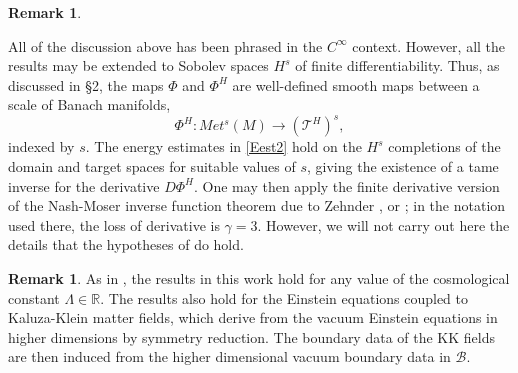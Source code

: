 \documentclass[10pt]{amsart}
\newcommand{\g}{\gamma}
\newcommand{\cT}{{\mathcal T}}
\newcommand{\cB}{{\mathcal B}}
\newcommand{\bR}{\mathbb R}
\renewcommand{\to}{\rightarrow}
\newcommand{\<}{\langle}
\renewcommand{\>}{\rangle}
\theoremstyle{plain}
\theoremstyle{remark}
\theoremstyle{definition}
\newtheorem{remark}[lemma]{Remark}
\numberwithin{equation}{section}
\begin{document}
\begin{remark} \label{findiff} 
{\rm All of the discussion above has been phrased in the $C^{\infty}$ context. However, all the results may be extended to Sobolev spaces $H^s$ of finite 
differentiability. Thus, as discussed in \S 2, the maps $\Phi$ and $\Phi^H$ are well-defined smooth maps 
between a scale of Banach manifolds, 
$$\Phi^H: Met^s(M) \to (\cT^H)^s,$$
indexed by $s$. The energy estimates in \eqref{Eest2} hold on the $H^s$ completions of the domain and target spaces for suitable values of $s$, giving the 
existence of a tame inverse for the derivative $D\Phi^H$. One may then apply the finite derivative version of the Nash-Moser inverse 
function theorem due to Zehnder \cite{Z1}, or \cite[Thm.6.3.3]{Z2}; in the notation used there, the loss of derivative is $\g = 3$. 
However, we will not carry out here the details that the hypotheses of \cite[Thm.6.3.3]{Z2} do hold. 

}
\end{remark}
 
 \begin{remark}
 {\rm 
  As in \cite{I}, the results in this work hold for any value of the cosmological constant $\Lambda \in \bR$. The results also hold for the Einstein equations 
coupled to Kaluza-Klein matter fields, which derive from the vacuum Einstein equations in higher dimensions by symmetry reduction. The boundary data 
of the KK fields are then induced from the higher dimensional vacuum boundary data in $\cB$. 
}
\end{remark} 









\end{document}
